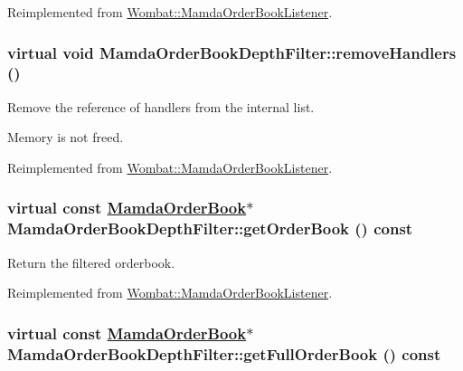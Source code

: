 Reimplemented from \hyperlink{classWombat_1_1MamdaOrderBookListener_81c34135bae76175b72fed83c3a6325c}{Wombat::Mamda\-Order\-Book\-Listener}.\hypertarget{classMamdaOrderBookDepthFilter_699f621c1462b0787b6c1391bd48f32a}{
\subsubsection[removeHandlers]{\setlength{\rightskip}{0pt plus 5cm}virtual void Mamda\-Order\-Book\-Depth\-Filter::remove\-Handlers ()}}
\label{classMamdaOrderBookDepthFilter_699f621c1462b0787b6c1391bd48f32a}


Remove the reference of handlers from the internal list. 

Memory is not freed. 

Reimplemented from \hyperlink{classWombat_1_1MamdaOrderBookListener_ba3e661b148450a0865b07cf169a12b1}{Wombat::Mamda\-Order\-Book\-Listener}.\hypertarget{classMamdaOrderBookDepthFilter_8ea01fc66c28b7ac4dbb3939e340aad0}{
\subsubsection[getOrderBook]{\setlength{\rightskip}{0pt plus 5cm}virtual const \hyperlink{classWombat_1_1MamdaOrderBook}{Mamda\-Order\-Book}$\ast$ Mamda\-Order\-Book\-Depth\-Filter::get\-Order\-Book () const}}
\label{classMamdaOrderBookDepthFilter_8ea01fc66c28b7ac4dbb3939e340aad0}


Return the filtered orderbook. 



Reimplemented from \hyperlink{classWombat_1_1MamdaOrderBookListener_882be50b668154aed7f170dbb2f47d34}{Wombat::Mamda\-Order\-Book\-Listener}.\hypertarget{classMamdaOrderBookDepthFilter_c1e0b29a1272610fb3b425cafe70410c}{
\subsubsection[getFullOrderBook]{\setlength{\rightskip}{0pt plus 5cm}virtual const \hyperlink{classWombat_1_1MamdaOrderBook}{Mamda\-Order\-Book}$\ast$ Mamda\-Order\-Book\-Depth\-Filter::get\-Full\-Order\-Book () const}}
\label{classMamdaOrderBookDepthFilter_c1e0b29a1272610fb3b425cafe70410c}


